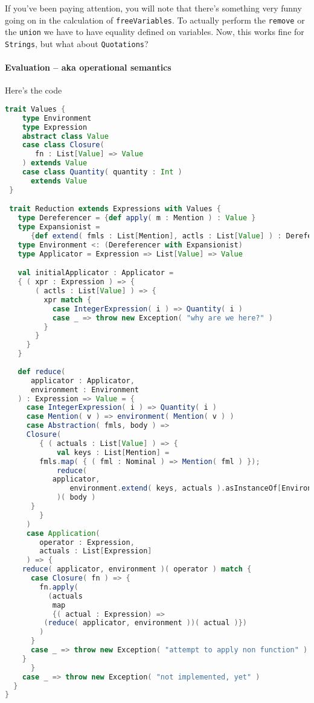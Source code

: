 If you've been paying attention, you will note that there's something
very funny going on in the calculation of
\lstinline[language=Scala]!freeVariables!. To actually perform the
\lstinline[language=Scala]!remove! or the
\lstinline[language=Scala]!union! we have to have equality defined on
variables. Now, this works fine for
\lstinline[language=Scala]!Strings!, but what about
\lstinline[language=Scala]!Quotations!?

\paragraph{Evaluation -- aka operational semantics}

Here's the code

\begin{lstlisting}[language=Scala]
  trait Values {
    type Environment
    type Expression
    abstract class Value
    case class Closure(
       fn : List[Value] => Value
    ) extends Value
    case class Quantity( quantity : Int )
      extends Value
 }

 trait Reduction extends Expressions with Values {
   type Dereferencer = {def apply( m : Mention ) : Value }
   type Expansionist =
      {def extend( fmls : List[Mention], actls : List[Value] ) : Dereferencer}
   type Environment <: (Dereferencer with Expansionist)
   type Applicator = Expression => List[Value] => Value

   val initialApplicator : Applicator =
   { ( xpr : Expression ) => {
       ( actls : List[Value] ) => {
         xpr match {
           case IntegerExpression( i ) => Quantity( i )
           case _ => throw new Exception( "why are we here?" )
         }
       }
     }
   }
   
   def reduce(
      applicator : Applicator,
      environment : Environment
   ) : Expression => Value = { 
     case IntegerExpression( i ) => Quantity( i )
     case Mention( v ) => environment( Mention( v ) )
     case Abstraction( fmls, body ) =>
     Closure(
        { ( actuals : List[Value] ) => {
            val keys : List[Mention] =
 	    fmls.map( { ( fml : Nominal ) => Mention( fml ) });
            reduce(
	       applicator,
               environment.extend( keys, actuals ).asInstanceOf[Environment]
            )( body )
	  }
        }
     )
     case Application(
        operator : Expression,
        actuals : List[Expression]
     ) => {
	reduce( applicator, environment )( operator ) match {
	  case Closure( fn ) => {
	    fn.apply(
	      (actuals
	       map
	       {( actual : Expression) =>
		 (reduce( applicator, environment ))( actual )})
	    )
	  }
	  case _ => throw new Exception( "attempt to apply non function" )
	}
      }
    case _ => throw new Exception( "not implemented, yet" )
  }
}
\end{lstlisting}